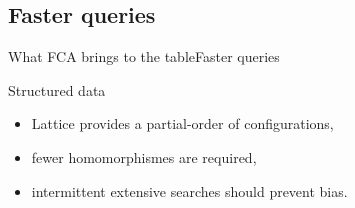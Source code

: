 %
\subsection{Faster queries}
\begin{frame}{What FCA brings to the table}{Faster queries}

\begin{block}{Structured data}
  \begin{itemize}
    \item Lattice provides a partial-order of configurations,
    \item fewer homomorphismes are required,
    \item intermittent extensive searches should prevent bias.
  \end{itemize}
\end{block}

\end{frame}

%
